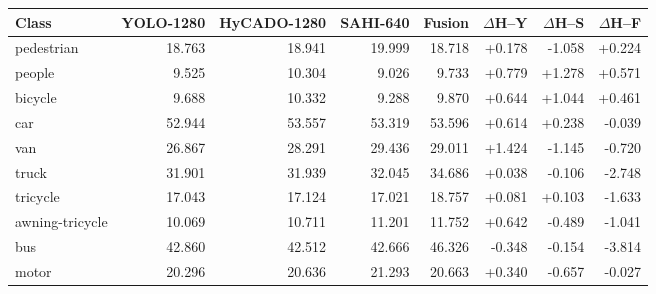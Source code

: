 \begin{tabular}{lrrrrrrr}
\toprule
Class & YOLO-1280 & HyCADO-1280 & SAHI-640 & Fusion & $\Delta$H--Y & $\Delta$H--S & $\Delta$H--F\\
\midrule
pedestrian & 18.763 & 18.941 & 19.999 & 18.718 & +0.178 & -1.058 & +0.224\\
people & 9.525 & 10.304 & 9.026 & 9.733 & +0.779 & +1.278 & +0.571\\
bicycle & 9.688 & 10.332 & 9.288 & 9.870 & +0.644 & +1.044 & +0.461\\
car & 52.944 & 53.557 & 53.319 & 53.596 & +0.614 & +0.238 & -0.039\\
van & 26.867 & 28.291 & 29.436 & 29.011 & +1.424 & -1.145 & -0.720\\
truck & 31.901 & 31.939 & 32.045 & 34.686 & +0.038 & -0.106 & -2.748\\
tricycle & 17.043 & 17.124 & 17.021 & 18.757 & +0.081 & +0.103 & -1.633\\
awning-tricycle & 10.069 & 10.711 & 11.201 & 11.752 & +0.642 & -0.489 & -1.041\\
bus & 42.860 & 42.512 & 42.666 & 46.326 & -0.348 & -0.154 & -3.814\\
motor & 20.296 & 20.636 & 21.293 & 20.663 & +0.340 & -0.657 & -0.027\\
\bottomrule
\end{tabular}

